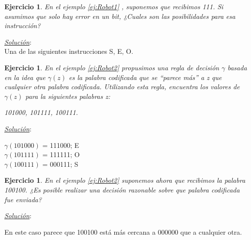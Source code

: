 \documentclass{beamer}
\theoremstyle{plain}
\theoremstyle{example}
\newtheorem{ejercicio} [Ejercicio]{Ejercicio}
\theoremstyle{example}
\begin{document}

\begin{frame}  \small 

\begin{ejercicio}
En el ejemplo \ref{ej:Robot1} , suponemos que recibimos 111. Si asumimos que solo hay error en un bit, ¿Cuales son las posibilidades para esa instrucción?
\end{ejercicio}


\textit{\underline{Solución}}:\\
\vspace{0.3cm}
Una de las siguientes instrucciones S, E, O.

\end{frame} 

\begin{frame}  \small 

\begin{ejercicio} 
En el ejemplo \ref{ej:Robot2} propusimos una regla de decisión $\gamma$ basada en la idea que $\gamma(z)$ es la palabra codificada que se ``parece más'' a z que cualquier otra palabra codificada. Utilizando esta regla, encuentra los valores de $\gamma(z)$ para la siguientes palabras z:

\begin{center}
101000,	101111,	100111.
\end{center}

\end{ejercicio}


\textit{\underline{Solución}}:\\
\vspace{0.3cm}

$\gamma(101000)$ = 111000; E\\
$\gamma(101111)$ = 111111; O \\
$\gamma(100111)$ = 000111; S\\


\end{frame}  

\begin{frame}  \small 

\begin{ejercicio} 
En el ejemplo \ref{ej:Robot2} suponemos ahora que recibimos la palabra 100100. ¿Es posible realizar una decisión razonable sobre que palabra codificada fue enviada?

\end{ejercicio}


\textit{\underline{Solución}}:\\
\vspace{0.3cm}

En este caso parece que 100100 está más cercana a 000000 que a cualquier otra.

\end{frame}  
\end{document}
